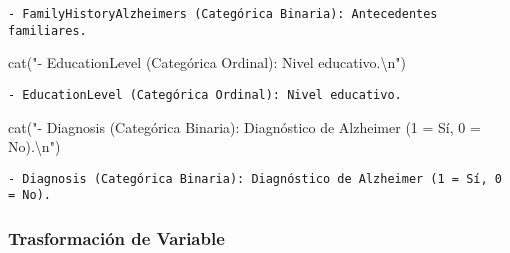 \documentclass[
  letterpaper,
  DIV=11,
  numbers=noendperiod]{scrartcl}
\newenvironment{Shaded}{\begin{snugshade}}{\end{snugshade}}
\newcommand{\FunctionTok}[1]{\textcolor[rgb]{0.28,0.35,0.67}{#1}}
\newcommand{\NormalTok}[1]{\textcolor[rgb]{0.00,0.23,0.31}{#1}}
\newcommand{\SpecialCharTok}[1]{\textcolor[rgb]{0.37,0.37,0.37}{#1}}
\newcommand{\StringTok}[1]{\textcolor[rgb]{0.13,0.47,0.30}{#1}}
\begin{document}
\begin{verbatim}
- FamilyHistoryAlzheimers (Categórica Binaria): Antecedentes familiares.
\end{verbatim}

\begin{Shaded}
\begin{Highlighting}[]
\FunctionTok{cat}\NormalTok{(}\StringTok{"{-} EducationLevel (Categórica Ordinal): Nivel educativo.}\SpecialCharTok{\textbackslash{}n}\StringTok{"}\NormalTok{)}
\end{Highlighting}
\end{Shaded}

\begin{verbatim}
- EducationLevel (Categórica Ordinal): Nivel educativo.
\end{verbatim}

\begin{Shaded}
\begin{Highlighting}[]
\FunctionTok{cat}\NormalTok{(}\StringTok{"{-} Diagnosis (Categórica Binaria): Diagnóstico de Alzheimer (1 = Sí, 0 = No).}\SpecialCharTok{\textbackslash{}n}\StringTok{"}\NormalTok{)}
\end{Highlighting}
\end{Shaded}

\begin{verbatim}
- Diagnosis (Categórica Binaria): Diagnóstico de Alzheimer (1 = Sí, 0 = No).
\end{verbatim}

\subsubsection{Trasformación de
Variable}\label{trasformaciuxf3n-de-variable}
\end{document}
